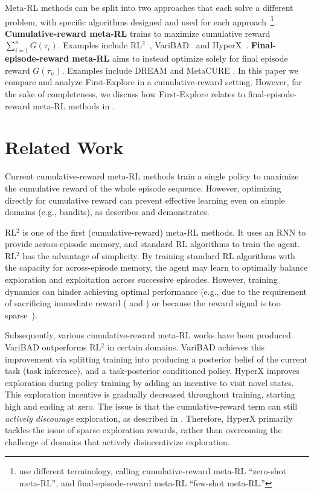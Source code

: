 \documentclass{article}
\begin{document}
Meta-RL methods can be split into two approaches that each solve a different problem, with specific algorithms designed and used for each approach~\citep{beck2023survey}\footnote{\cite{beck2023survey} use different terminology, calling cumulative-reward meta-RL ``zero-shot meta-RL'', and final-episode-reward meta-RL ``few-shot meta-RL.''}. \textbf{Cumulative-reward meta-RL} trains to maximize cumulative reward \(\sum_{i=1}^n G(\tau_i)\). Examples include RL\(^2\)~\cite{rl2, rl2alt}, VariBAD~\cite{VariBAD} and HyperX~\cite{hyperx}. \textbf{Final-episode-reward meta-RL} aims to instead optimize solely for final episode reward \(G(\tau_n)\). Examples include DREAM \citep{liu2021decoupling} and MetaCURE \citep{metacure}. In this paper we compare and analyze First-Explore in a cumulative-reward setting. However, for the sake of completeness, we discuss how First-Explore relates to final-episode-reward meta-RL methods in .

\section{Related Work}

Current cumulative-reward meta-RL methods train a single policy to maximize the cumulative reward of the whole episode sequence. However, optimizing directly for cumulative reward can prevent effective learning even on simple domains (e.g., bandits), as  describes and  demonstrates.

RL\(^2\) \citep{rl2, rl2alt} is one of the first (cumulative-reward) meta-RL methods. It uses an RNN to provide across-episode memory, and standard RL algorithms to train the agent. RL\(^2\) has the advantage of simplicity. By training standard RL algorithms with the capacity for across-episode memory, the agent may learn to optimally balance exploration and exploitation across successive episodes. %
However, training dynamics can hinder achieving optimal performance (e.g., due to the requirement of sacrificing immediate reward ( and ) or because the reward signal is too sparse~\cite{hyperx}).

Subsequently, various cumulative-reward meta-RL works have been produced.
%
VariBAD \citep{VariBAD} outperforms RL\(^2\) in certain domains. VariBAD achieves this improvement via splitting training into producing a posterior belief of the current task (task inference), and a task-posterior conditioned policy. 
%
HyperX \citep{hyperx} improves exploration during policy training by adding an incentive to visit novel states. This exploration incentive is gradually decreased throughout training, starting high and ending at zero.
%
The issue is that the cumulative-reward term can still \emph{actively discourage} exploration, as described in .
%
Therefore, HyperX primarily tackles the issue of sparse exploration rewards, rather than overcoming the challenge of domains that actively disincentivize exploration.
\end{document}
